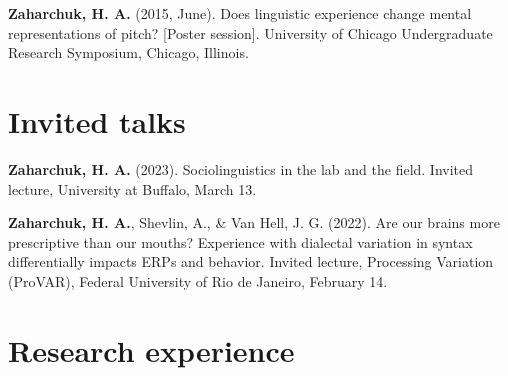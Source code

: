 \documentclass[11pt,a4paper,]{awesome-cv}
\begin{document}
\leavevmode{}%
\textbf{\textbf{Zaharchuk, H.} A.} (2015, June). Does linguistic experience change mental
representations of pitch? {[}Poster session{]}. University of Chicago
Undergraduate Research Symposium, Chicago, Illinois.

\hypertarget{invited-talks}{%
\section{Invited talks}\label{invited-talks}}

\hypertarget{bibliography}{}
\leavevmode{}%
\textbf{\textbf{Zaharchuk, H.} A.} (2023). Sociolinguistics in the lab and the field.
Invited lecture, University at Buffalo, March 13.

\leavevmode{}%
\textbf{\textbf{Zaharchuk, H.} A.}, Shevlin, A., \& Van Hell, J. G. (2022). Are our brains
more prescriptive than our mouths? Experience with dialectal variation
in syntax differentially impacts ERPs and behavior. Invited lecture,
Processing Variation (ProVAR), Federal University of Rio de Janeiro,
February 14.

\pagebreak

\hypertarget{research-experience}{%
\section{Research experience}\label{research-experience}}
\end{document}
